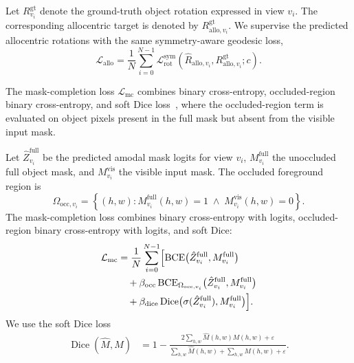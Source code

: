 Let \(R^{\mathrm{gt}}_{v_i}\) denote the
ground-truth object rotation expressed in view \(v_i\). The corresponding
allocentric target is denoted by \(R^{\mathrm{gt}}_{\mathrm{allo},v_i}\). We
supervise the predicted allocentric rotations with the same symmetry-aware
geodesic loss,
\[
\mathcal{L}_{\mathrm{allo}}
=
\frac{1}{N}
\sum_{i=0}^{N-1}
\mathcal{L}^{\mathrm{sym}}_{\mathrm{rot}}
\left(
\hat{R}_{\mathrm{allo},v_i},
R^{\mathrm{gt}}_{\mathrm{allo},v_i};
c
\right).
\]

The mask-completion loss \(\mathcal{L}_{\mathrm{mc}}\) combines binary cross-entropy, occluded-region binary cross-entropy, and soft Dice loss~\cite{milletari2016vnet}, where the occluded-region term is evaluated on object pixels present in the full mask but absent from the visible input mask.

Let \(\hat{Z}^{\mathrm{full}}_{v_i}\) be the predicted amodal
mask logits for view \(v_i\), \(M^{\mathrm{full}}_{v_i}\) the unoccluded
full object mask, and \(M^{\mathrm{vis}}_{v_i}\) the visible input mask.
The occluded foreground region is
\[
\Omega_{\mathrm{occ},v_i}
=
\left\{
(h,w):
M^{\mathrm{full}}_{v_i}(h,w)=1
\;\land\;
M^{\mathrm{vis}}_{v_i}(h,w)=0
\right\}.
\]
The mask-completion loss combines binary cross-entropy with logits, occluded-region binary cross-entropy with logits, and soft Dice:
\[
\begin{aligned}
\mathcal{L}_{\mathrm{mc}}
&=
\frac{1}{N}
\sum_{i=0}^{N-1}
\Bigl[
\operatorname{BCE}
\bigl(
\hat{Z}^{\mathrm{full}}_{v_i},
M^{\mathrm{full}}_{v_i}
\bigr) \\
&\quad
+
\beta_{\mathrm{occ}}
\operatorname{BCE}_{\Omega_{\mathrm{occ},v_i}}
\bigl(
\hat{Z}^{\mathrm{full}}_{v_i},
M^{\mathrm{full}}_{v_i}
\bigr) \\
&\quad
+
\beta_{\mathrm{dice}}
\operatorname{Dice}
\bigl(
\sigma(\hat{Z}^{\mathrm{full}}_{v_i}),
M^{\mathrm{full}}_{v_i}
\bigr)
\Bigr].
\end{aligned}
\]
We use the soft Dice loss
\[
\begin{aligned}
\operatorname{Dice}(\hat{M},M) &=
1-
\frac{
2\sum_{h,w}\hat{M}(h,w)M(h,w)+\varepsilon
}{
\sum_{h,w}\hat{M}(h,w)+\sum_{h,w}M(h,w)+\varepsilon
}.
\end{aligned}
\]


